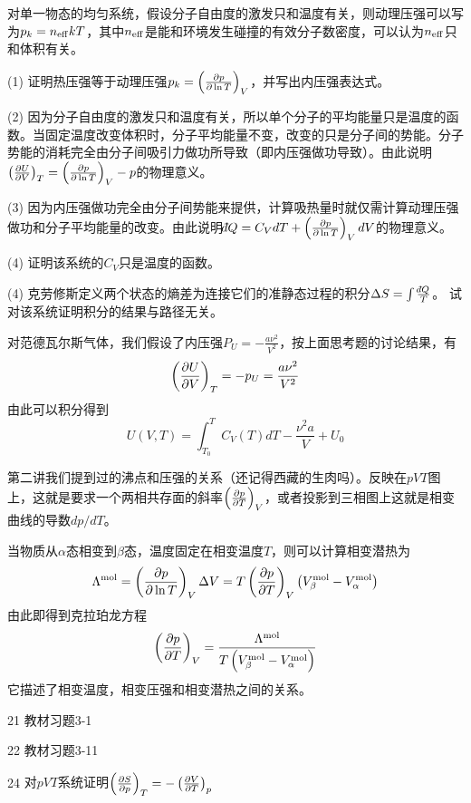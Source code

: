 \documentclass[CJK]{beamer}
\begin{document}
\begin{frame}
\bch
{\small
对单一物态的均匀系统，假设分子自由度的激发只和温度有关，则动理压强可以写为$p_k=n_{\rm eff} kT$，其中$n_{\rm eff}$是能和环境发生碰撞的有效分子数密度，可以认为$n_{\rm eff}$只和体积有关。
\bitem
\item[(1)]{证明热压强等于动理压强$p_k = \left(\frac{\partial p}{\partial \ln T}\right)_{V}$，并写出内压强表达式。}
\item[(2)]{因为分子自由度的激发只和温度有关，所以单个分子的平均能量只是温度的函数。当固定温度改变体积时，分子平均能量不变，改变的只是分子间的势能。分子势能的消耗完全由分子间吸引力做功所导致（即内压强做功导致）。由此说明$\left(\frac{\partial U}{\partial V}\right)_{T} = \left(\frac{\partial p}{\partial \ln T}\right)_{V} - p$的物理意义。}
\item[(3)]{因为内压强做功完全由分子间势能来提供，计算吸热量时就仅需计算动理压强做功和分子平均能量的改变。由此说明$\dbar Q = C_V dT + \pfrac p{\ln T}V dV$的物理意义。}
\item[(4)]{证明该系统的$C_V$只是温度的函数。}
\item[(4)]{克劳修斯定义两个状态的熵差为连接它们的准静态过程的积分$\Delta S = \int \frac{\dbar Q}{T}$。
试对该系统证明积分的结果与路径无关。}
\eitem
}
\ech
\end{frame}


\begin{frame}
\bch
{\small
对范德瓦尔斯气体，我们假设了内压强$P_U = -\frac{a\nu^2}{V^2}$，按上面思考题的讨论结果，有
$$\left(\frac{\partial U}{\partial V}\right)_{T} = -p_U = \frac{a\nu^2}{V^2}$$
由此可以积分得到
$$U(V, T) = \int_{T_0}^T C_V(T) dT -\frac{\nu^2a}{V} + U_0$$
}
\ech
\end{frame}


\begin{frame}
\bch
第二讲我们提到过的沸点和压强的关系（还记得西藏的生肉吗）。反映在$pVT$图上，这就是要求一个两相共存面的斜率$\left(\frac{\partial p}{\partial T}\right)_{V}$，或者投影到三相图上这就是相变曲线的导数$dp/dT$。
 
\ech
\end{frame}

\begin{frame}
\bch
当物质从$\alpha$态相变到$\beta$态，温度固定在相变温度$T$，则可以计算相变潜热为
$$ \Lambda^{\rm mol} = \left(\frac{\partial p}{\partial \ln T}\right)_{V} \Delta V = T \left(\frac{\partial p}{\partial T}\right)_{V} \left(V_{\beta}^{\rm mol}-V_{\alpha}^{\rm mol}\right)$$
由此即得到{\blue 克拉珀龙方程
$$\left(\frac{\partial p}{\partial T}\right)_{V} = \frac{\Lambda^{\rm mol}}{T \left(V_{\beta}^{\rm mol}-V_{\alpha}^{\rm mol}\right)} $$}
它描述了相变温度，相变压强和相变潜热之间的关系。
\ech
\end{frame}





\begin{frame}
\bch

\bitem
\item[21]{ 教材习题3-1}
\item[22]{ 教材习题3-11}
\item[24]{ 对$pVT$系统证明$\left(\frac{\partial S}{\partial p}\right)_{T} = - \left(\frac{\partial V}{\partial T}\right)_{p}$}
\eitem
\ech
\end{frame}
\end{document}
